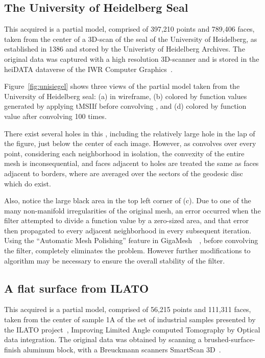%
%
%
%
\subsection{The University of Heidelberg Seal}
\label{ch6sATDDssUHS}
This acquired \tdd{} is a partial model, comprised of 397,210 points and 789,406 faces, taken from the center of a 3D-scan of the seal of the University of Heidelberg, as established in 1386 and stored by the Univeristy of Heidelberg Archives. The original data was captured with a high resolution 3D-scanner and is stored in the heiDATA dataverse of the IWR Computer Graphics~\cite{Unisiegel}.

Figure~\ref{fig:unisiegel} shows three views of the partial model taken from the University of Heidelberg seal: (a) in wireframe, (b) colored by function values generated by applying \gls{tMSIIf} before convolving , and (d) colored by function value after convolving  100 times.



There exist several holes in this \tdd{}, including the relatively large hole in the lap of the figure, just below the center of each image. However, as  convolves over every point, considering each neighborhood in isolation, the convexity of the entire mesh is inconsequential, and faces adjacent to holes are treated the same as faces adjacent to borders, where  are averaged over the sectors of the geodesic disc which do exist.

Also, notice the large black area in the top left corner of (c). Due to one of the many non-manifold irregularities of the original mesh, an error occurred when the filter attempted to divide a function value by a zero-sized area, and that error then propagated to every adjacent neighborhood in every subsequent iteration. Using the ``Automatic Mesh Polishing'' feature in GigaMesh~\cite[p.~29-32]{Mara12}~\cite[p.7]{Giga17}, before convolving the filter, completely eliminates the problem. However further modifications to  algorithm may be necessary to ensure the overall stability of the filter.

%
%
%
%
\subsection{A flat surface from \gls{ILATO}}
\label{ch6sATDDssI}
This acquired \tdd{} is a partial model, comprised of 56,215 points and 111,311 faces, taken from the center of sample 1A of the set of industrial samples presented by the \gls{ILATO} project~, Improving Limited Angle computed Tomography by Optical data integration\cite{ILATO14}. The original data was obtained by scanning a brushed-surface-finish aluminum block, with a Breuckmann scanners SmartScan 3D~\cite{Bayer16}.

